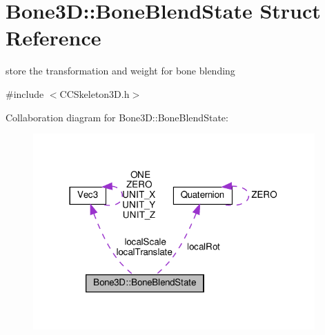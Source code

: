 \hypertarget{structBone3D_1_1BoneBlendState}{}\section{Bone3D\+:\+:Bone\+Blend\+State Struct Reference}
\label{structBone3D_1_1BoneBlendState}


store the transformation and weight for bone blending  




{\ttfamily \#include $<$C\+C\+Skeleton3\+D.\+h$>$}



Collaboration diagram for Bone3D\+:\+:Bone\+Blend\+State\+:
\nopagebreak
\begin{figure}[H]
\begin{center}
\leavevmode
\includegraphics[width=306pt]{structBone3D_1_1BoneBlendState__coll__graph}
\end{center}
\end{figure}
